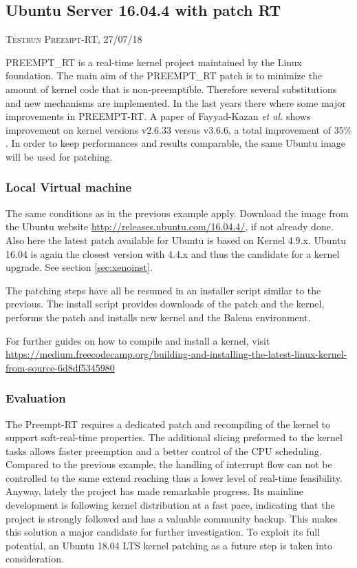 \documentclass[]{scrartcl}
\begin{document}
\subsection{Ubuntu Server 16.04.4 with patch RT}

{\small\textsc{Testrun Preempt-RT, 27/07/18} \bigskip}

PREEMPT\_RT is a real-time kernel project maintained by the Linux foundation. 
The main aim of the PREEMPT\_RT patch is to minimize the amount of kernel code that is non-preemptible. Therefore several substitutions and new mechanisms are implemented.
In the last years there where some major improvements in PREEMPT-RT. A paper of Fayyad-Kazan \textit{et al.} shows improvement on kernel versions v2.6.33 versus v3.6.6, a total improvement of 35\% \cite{Fayyad-Kazanetal2014}. In order to keep performances and results comparable, the same Ubuntu image will be used for patching.

\subsubsection{Local Virtual machine}

The same conditions as in the previous example apply. Download the image from the Ubuntu website \url{http://releases.ubuntu.com/16.04.4/}, if not already done. Also here the latest patch available for Ubuntu is based on Kernel 4.9.x. Ubuntu 16.04 is again the closest version with 4.4.x and thus the candidate for a kernel upgrade. See section \ref{sec:xenoinst}.

The patching steps have all be resumed in an installer script similar to the previous. The install script provides downloads of the patch and the kernel, performs the patch and installs new kernel and the Balena environment.


For further guides on how to compile and install a kernel, visit \url{ https://medium.freecodecamp.org/building-and-installing-the-latest-linux-kernel-from-source-6d8df5345980}

\subsubsection{Evaluation}

The Preempt-RT requires a dedicated patch and recompiling of the kernel to support soft-real-time properties. The additional slicing preformed to the kernel tasks allows faster preemption and a better control of the CPU scheduling. Compared to the previous example, the handling of interrupt flow can not be controlled to the same extend reaching thus a lower level of real-time feasibility. Anyway, lately the project has made remarkable progress.
Its mainline development is following kernel distribution at a fast pace, indicating that the project is strongly followed and has a valuable community backup. This makes this solution a major candidate for further investigation.
To exploit its full potential, an Ubuntu 18.04 LTS kernel patching as a future step is taken into consideration.
\end{document}
